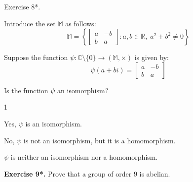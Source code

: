 \documentclass[../lecture-notes-148x210.tex]{subfiles}
\begin{document}
\begin{xexercise}
    {Exercise 8*.}
    {
        Introduce the set $\mathbb{M}$ as follows:
        \begin{equation*}
            \mathbb{M} = \left\{ \begin{bmatrix}
                a & -b \\ b & a
            \end{bmatrix}: a,b \in \mathbb{R}, \; a^2+b^2 \neq 0 \right\}
        \end{equation*}

        Suppose the function $\psi: \mathbb{C} \setminus \{0\} \to (\mathbb{M},\times)$ is given by:
        \begin{equation*}
            \psi(a+bi) = \begin{bmatrix}
                a & -b \\ b & a
            \end{bmatrix}
        \end{equation*}

        Is the function $\psi$ an isomorphism?
    }
    {1}
    {
        \item Yes, $\psi$ is an isomorphism.
        \item No, $\psi$ is not an isomorphism, but it is a homomorphism.
        \item $\psi$ is neither an isomorphism nor a homomorphism.
    }
\end{xexercise}

\textbf{Exercise 9*.} Prove that a group of order $9$ is abelian.
\end{document}
